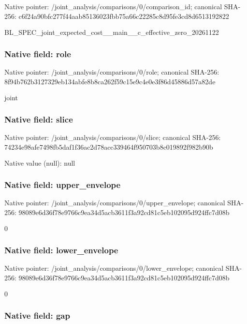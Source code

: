 \documentclass[10pt,a4paper]{article}
\begin{document}
Native pointer: /joint\_analysis/comparis\allowbreak{}ons/0/comparison\_id; canonical SHA-256: c6f24a90bfc277f44aab8513\allowbreak{}6023fbb75a66c22285c8d95f\allowbreak{}e3cd8d6513192822


BL\_SPEC\_joint\_expected\_c\allowbreak{}ost\_\_main\_\_c\_effective\_z\allowbreak{}ero\_20261122


\subsubsection{Native field: role}


Native pointer: /joint\_analysis/comparisons/0/role; canonical SHA-256: 8f94b762b3127329eb134abf\allowbreak{}e8b8ca262f59c15e9c4e0e3f\allowbreak{}86d45886d57a82de


joint


\subsubsection{Native field: slice}


Native pointer: /joint\_analysis/comparisons/0/slice; canonical SHA-256: 74234e98afe7498fb5daf1f3\allowbreak{}6ac2d78acc339464f950703b\allowbreak{}8c019892f982b90b



Native value (null): null



\subsubsection{Native field: upper\_envelope}


Native pointer: /joint\_analysis/comparis\allowbreak{}ons/0/upper\_envelope; canonical SHA-256: 98089e6d36f78e9766c9ea34\allowbreak{}d5acb3611f3a92cd81c5eb10\allowbreak{}2095d924ffc7d08b


0


\subsubsection{Native field: lower\_envelope}


Native pointer: /joint\_analysis/comparis\allowbreak{}ons/0/lower\_envelope; canonical SHA-256: 98089e6d36f78e9766c9ea34\allowbreak{}d5acb3611f3a92cd81c5eb10\allowbreak{}2095d924ffc7d08b


0


\subsubsection{Native field: gap}
\end{document}
